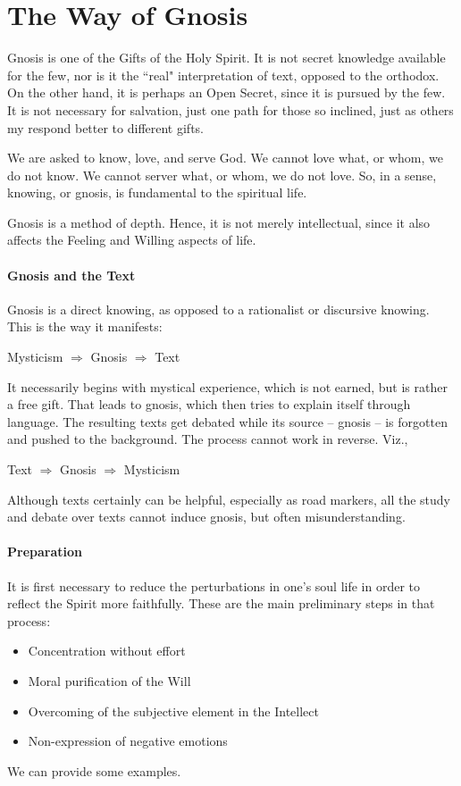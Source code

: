 \section{The Way of Gnosis}

Gnosis is one of the Gifts of the Holy Spirit. It is not secret knowledge available for the few, nor is it the ``real"
interpretation of text, opposed to the orthodox. On the other hand, it is perhaps an Open Secret, since it is pursued
by the few. It is not necessary for salvation, just one path for those so inclined, just as others my respond better to
different gifts.

We are asked to know, love, and serve God. We cannot love what, or whom, we do not know. We cannot server what, or whom,
we do not love. So, in a sense, knowing, or gnosis, is fundamental to the spiritual life.

Gnosis is a method of depth. Hence, it is not merely intellectual, since it also affects the Feeling and Willing aspects
of life.

\paragraph{Gnosis and the Text}
Gnosis is a direct knowing, as opposed to a rationalist or discursive knowing. This is the way it manifests:

Mysticism $\Rightarrow$ Gnosis $\Rightarrow$ Text

It necessarily begins with mystical experience, which is not earned, but is rather a free gift. That leads to gnosis,
which then tries to explain itself through language. The resulting texts get debated while its source – gnosis – is
forgotten and pushed to the background. The process cannot work in reverse. Viz.,

Text $\Rightarrow$ Gnosis $\Rightarrow$ Mysticism

Although texts certainly can be helpful, especially as road markers, all the study and debate over texts cannot induce
gnosis, but often misunderstanding.

\paragraph{Preparation}
It is first necessary to reduce the perturbations in one's soul life in order to reflect the Spirit
more faithfully. These are the main preliminary steps in that process:

\begin{itemize}
\item Concentration without effort 
\item Moral purification of the Will 
\item Overcoming of the subjective element in the Intellect 
\item Non-expression of negative emotions 
\end{itemize}
We can provide some examples.

